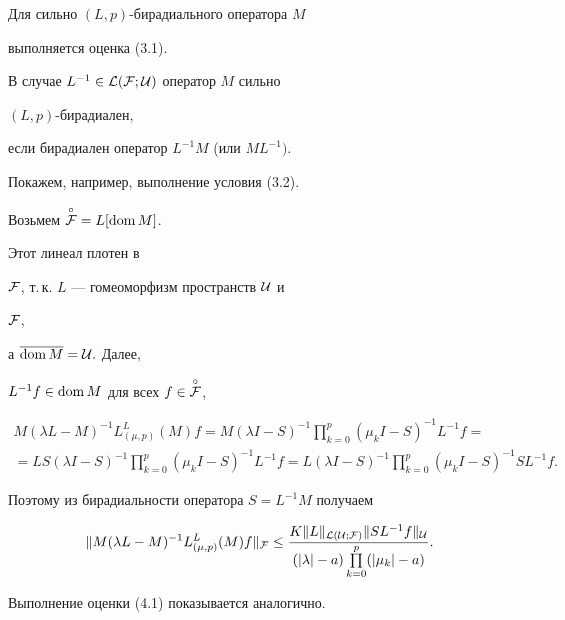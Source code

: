 \begin{notes}


Для  сильно $(L,p)$-бирадиального оператора $M$


выполняется оценка (3.1).


\end{notes}





\begin{notes}


В случае $L^{-1}\in {\cal L(\cal F;\cal U)}$ оператор $M$ сильно


$(L,p)$-бирадиален,


если бирадиален оператор $L^{-1}M$ (или $ML^{-1}).$


Покажем, например, выполнение условия (3.2).


Возьмем $\overset{\circ}{{\cal F}}{}=L[\operatorname{dom} M]$.


Этот линеал плотен в


${\cal F}$, т.\,к. $L$ --- гомеоморфизм пространств ${\cal U}$ и


${\cal F}$,


а $\overline{\operatorname{dom} M} ={\cal U}.$ Далее,


$L^{-1}f\in \operatorname{dom} M$ для всех $f\in\overset{\circ}{{\cal F}}$,


\begin{multline*}


M(\lambda L-M)^{-1}L^L_{(\mu ,p)} (M)f=M(\lambda I-S)^{-1} \prod^p_{k=0}


(\mu_k I-S)^{-1}L^{-1}f= \\


%


=LS(\lambda I-S)^{-1} \prod^p_{k=0} (\mu_k I-S)^{-1}L^{-1}f=


L(\lambda I-S)^{-1} \prod^p_{k=0} (\mu_k I-S)^{-1}SL^{-1}f.


\end{multline*}


Поэтому из бирадиальности оператора $S=L^{-1}M$ получаем


$$


\| M(\lambda L-M)^{-1}L^L_{(\mu ,p)} (M)f\|_{\cal F} \le \frac{K\| L\| _


{\cal L(\cal U;\cal F)} \| SL^{-1}f \| _{\cal U}}{(|\lambda |-a)


\prod\limits^p_{k=0} (|\mu_k |


-a)}.


$$


Выполнение оценки (4.1) показывается аналогично.


\end{notes}





